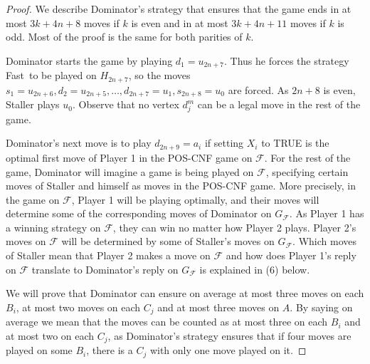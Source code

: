 \documentclass[12pt]{article}
\newcommand{\F}{\mathcal{F}}
\newcommand{\fast}{{\sc Fast}}
\begin{document}
\begin{proof}
	We describe Dominator's strategy that ensures that the game ends in at most $3k + 4n + 8$ moves if $k$ is even and in at most $3k + 4n + 11$ moves if $k$ is odd. Most of the proof is the same for both parities of $k$.
	
	Dominator starts the game by playing $d_1 = u_{2n+7}$. Thus he forces the strategy \fast\ to be played on $H_{2n+7}$, so the moves $s_1 = u_{2n+6}, d_2 = u_{2n+5}, \ldots, d_{2n+7} = u_1, s_{2n+8} = u_0$ are forced. As $2n+8$ is even, Staller plays $u_0$. Observe that no vertex $d_j^m$ can be a legal move in the rest of the game.
	
	Dominator's next move is to play $d_{2n+9} = a_i$ if setting $X_i$ to TRUE is the optimal first move of Player 1 in the POS-CNF game on $\F$. For the rest of the game, Dominator will imagine a game is being played on $\F$, specifying certain moves of Staller and himself as moves in the POS-CNF game. More precisely, in the game on $\F$, Player 1 will be playing optimally, and their moves will determine some of the corresponding moves of Dominator on $G_\F$. As Player 1 has a winning strategy on $\F$, they can win no matter how Player 2 plays. Player 2's moves on $\F$ will be determined by some of Staller's moves on $G_\F$. Which moves of Staller mean that Player 2 makes a move on $\F$ and how does Player 1's reply on $\F$ translate to Dominator's reply on $G_\F$ is explained in (6) below.
	
	We will prove that Dominator can ensure on average at most three moves on each $B_i$, at most two moves on each $C_j$ and at most three moves on $A$. By saying on average we mean that the moves can be counted as at most three on each $B_i$ and at most two on each $C_j$, as Dominator's strategy ensures that if four moves are played on some $B_i$, there is a $C_j$ with only one move played on it. 
	

\end{proof}
\end{document}
